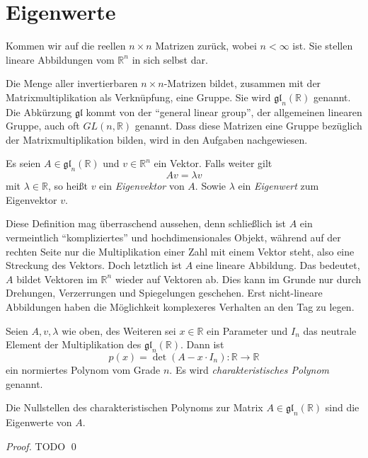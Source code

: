 


\chapter{Eigenwerte}

Kommen wir auf die reellen $n\times n$ Matrizen zurück, wobei $n<\infty$ ist. Sie stellen lineare Abbildungen vom $\mathbb{R}^n$ in sich selbst dar. 
\begin{definition}
Die Menge aller invertierbaren $n\times n$-Matrizen bildet, zusammen mit der Matrixmultiplikation als Verknüpfung, eine Gruppe. Sie wird $\mathfrak{gl}_n(\mathbb{R})$ genannt. Die Abkürzung $\mathfrak{gl}$ kommt von der "`general linear group"', der allgemeinen linearen Gruppe, auch oft $GL(n,\mathbb{R})$ genannt. Dass diese Matrizen eine Gruppe bezüglich der Matrixmultiplikation bilden, wird in den Aufgaben nachgewiesen.
\end{definition}


\begin{definition}
Es seien $A\in \mathfrak{gl}_n(\mathbb{R})$ und $v\in \mathbb{R}^n$ ein Vektor. Falls weiter gilt
\[
Av = \lambda v
\]
mit $\lambda\in \mathbb{R}$, so heißt $v$ ein \textsl{Eigenvektor} von $A$. Sowie $\lambda$ ein \textsl{Eigenwert} zum Eigenvektor $v$.
\end{definition}

Diese Definition mag überraschend aussehen, denn schließlich ist $A$ ein vermeintlich "`kompliziertes"' und hochdimensionales Objekt, während auf der rechten Seite nur die Multiplikation einer Zahl mit einem Vektor steht, also eine Streckung des Vektors. Doch letztlich ist $A$ eine lineare Abbildung. Das bedeutet, $A$ bildet Vektoren im $\mathbb{R}^n$ wieder auf Vektoren ab. Dies kann im Grunde nur durch Drehungen, Verzerrungen und Spiegelungen geschehen. Erst nicht-lineare Abbildungen haben die Möglichkeit komplexeres Verhalten an den Tag zu legen. 

\begin{definition}
Seien $A,v,\lambda$ wie oben, des Weiteren sei $x\in \mathbb{R}$ ein Parameter und $I_n$ das neutrale Element der Multiplikation des $\mathfrak{gl}_n(\mathbb{R})$. Dann ist 
\[
p(x) = \det(A-x\cdot I_n) : \mathbb{R} \longrightarrow \mathbb{R}
\]
ein normiertes Polynom vom Grade $n$. Es wird \textsl{charakteristisches Polynom} genannt.
\end{definition}

\begin{theorem}
Die Nullstellen des charakteristischen Polynoms zur Matrix $A\in \mathfrak{gl}_n(\mathbb{R})$ sind die Eigenwerte von $A$.
\end{theorem}
\begin{proof}
TODO
\qed
\end{proof}

